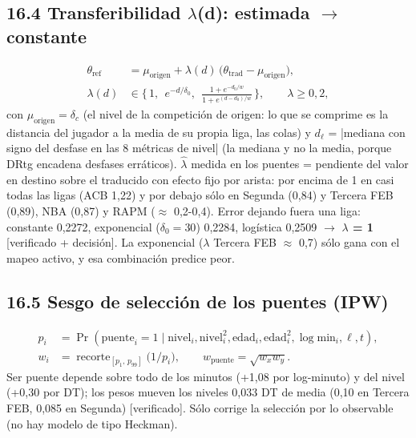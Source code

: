 \documentclass[10pt,a4paper]{article}
\begin{document}
\subsection*{16.4 Transferibilidad \ensuremath{\lambda}(d): estimada \ensuremath{\to} constante}
\[
\begin{aligned} \theta_{\mathrm{ref}} &= \mu_{\mathrm{origen}} + \lambda(d)\,\big(\theta_{\mathrm{trad}} - \mu_{\mathrm{origen}}\big),\\ \lambda(d) &\in \Big\{\,1,\ \ e^{-d/\delta_0},\ \ \frac{1 + e^{-d_0/w}}{1 + e^{(d-d_0)/w}}\,\Big\}, \qquad \lambda \ge 0{,}2 , \end{aligned}
\]
con $\mu_{\mathrm{origen}} = \delta_c$ (el nivel de la competición de origen: lo que se comprime es la distancia del jugador a la media de su propia liga, las colas) y $d_\ell$ = |mediana con signo del desfase en las 8 métricas de nivel| (la mediana y no la media, porque DRtg encadena desfases erráticos). $\hat\lambda$ medida en los puentes = pendiente del valor en destino sobre el traducido con efecto fijo por arista: por encima de 1 en casi todas las ligas (ACB 1,22) y por debajo sólo en Segunda (0,84) y Tercera FEB (0,89), NBA (0,87) y RAPM (\ensuremath{\approx} 0,2-0,4). Error dejando fuera una liga: constante 0,2272, exponencial ($\delta_0 = 30$) 0,2284, logística 0,2509 \ensuremath{\to} \textbf{\ensuremath{\lambda} = 1} [verificado + decisión]. La exponencial (\ensuremath{\lambda} Tercera FEB \ensuremath{\approx} 0,7) sólo gana con el mapeo activo, y esa combinación predice peor.

\subsection*{16.5 Sesgo de selección de los puentes (IPW)}
\[
\begin{aligned} p_i &= \Pr(\text{puente}_i = 1 \mid \text{nivel}_i, \text{nivel}_i^2, \text{edad}_i, \text{edad}_i^2, \log \text{min}_i, \ell, t),\\ w_i &= \operatorname{recorte}_{[p_1,\,p_{99}]}\!\big(1/p_i\big), \qquad w_{\mathrm{puente}} = \sqrt{w_x w_y} . \end{aligned}
\]
Ser puente depende sobre todo de los minutos (+1,08 por log-minuto) y del nivel (+0,30 por DT); los pesos mueven los niveles 0,033 DT de media (0,10 en Tercera FEB, 0,085 en Segunda) [verificado]. Sólo corrige la selección por lo observable (no hay modelo de tipo Heckman).
\end{document}
